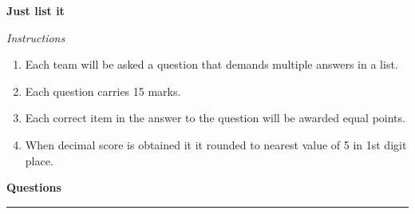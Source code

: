 \documentclass[10pt,a4paper]{exam}
\begin{document}
\begin{center}
{\textbf {\LARGE Just list it}}
\end{center}

{\Large
\textit{Instructions}
}

\begin{enumerate}
\item Each team will be asked a question that demands multiple answers in a list. 
\item Each question carries 15 marks.
\item Each correct item in the answer to the question will be awarded equal points.
\item When decimal score is obtained it it rounded to nearest value of 5 in 1st digit place.
\end{enumerate}

\vspace{1cm}

{\Large
\textbf{Questions} \\[1mm]
\hrule
}
\end{document}
